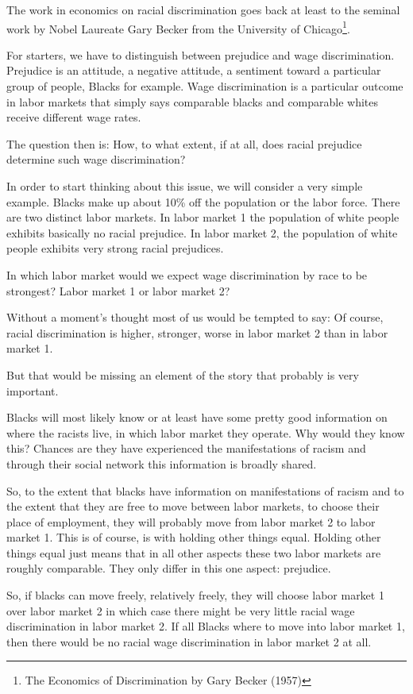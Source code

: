 \documentclass[
]{book}
\begin{document}
The work in economics on racial discrimination goes back at least to the seminal work by Nobel Laureate Gary Becker from the University of Chicago\footnote{The Economics of Discrimination by Gary Becker (1957)}.

For starters, we have to distinguish between prejudice and wage discrimination. Prejudice is an attitude, a negative attitude, a sentiment toward a particular group of people, Blacks for example. Wage discrimination is a particular outcome in labor markets that simply says comparable blacks and comparable whites receive different wage rates.

The question then is: How, to what extent, if at all, does racial prejudice determine such wage discrimination?

In order to start thinking about this issue, we will consider a very simple example. Blacks make up about 10\% off the population or the labor force. There are two distinct labor markets. In labor market 1 the population of white people exhibits basically no racial prejudice. In labor market 2, the population of white people exhibits very strong racial prejudices.

In which labor market would we expect wage discrimination by race to be strongest? Labor market 1 or labor market 2?

Without a moment's thought most of us would be tempted to say: Of course, racial discrimination is higher, stronger, worse in labor market 2 than in labor market 1.

But that would be missing an element of the story that probably is very important.

Blacks will most likely know or at least have some pretty good information on where the racists live, in which labor market they operate. Why would they know this? Chances are they have experienced the manifestations of racism and through their social network this information is broadly shared.

So, to the extent that blacks have information on manifestations of racism and to the extent that they are free to move between labor markets, to choose their place of employment, they will probably move from labor market 2 to labor market 1. This is of course, is with holding other things equal. Holding other things equal just means that in all other aspects these two labor markets are roughly comparable. They only differ in this one aspect: prejudice.

So, if blacks can move freely, relatively freely, they will choose labor market 1 over labor market 2 in which case there might be very little racial wage discrimination in labor market 2. If all Blacks where to move into labor market 1, then there would be no racial wage discrimination in labor market 2 at all.
\end{document}
